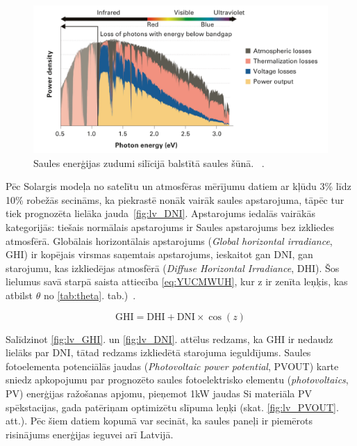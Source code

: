 \begin{figure}[h]
    \centering
    \includegraphics[width=\linewidth]{figures/misc/energyLosses.png}
    \caption{Saules enerģijas zudumi silīcijā balstītā saules šūnā.  ~\cite{Sivaram}.}
    \label{fig:zudumi}
\end{figure}


Pēc Solargis modeļa no satelītu un atmosfēras mērījumu datiem ar kļūdu 3\% līdz 10\% robežās secināms, ka piekrastē nonāk vairāk saules apstarojuma, tāpēc tur tiek prognozēta lielāka jauda~\ref{fig:lv_DNI}. Apstarojums iedalās vairākās kategorijās:
tiešais normālais apstarojums ir Saules apstarojums bez izkliedes atmosfērā.
Globālais horizontālais apstarojums (\textit{Global horizontal irradiance}, GHI) ir kopējais virsmas saņemtais apstarojums, ieskaitot gan DNI, gan starojumu, kas izkliedējas atmosfērā (\textit{Diffuse Horizontal Irradiance}, DHI). Šos lielumus savā starpā saista attiecība \ref{eq:YUCMWUH}, kur z ir zenīta leņķis, kas atbilst $\theta$ no \ref{tab:theta}. tab.)~\cite{Sivaram}.

\begin{equation}
\label{eq:YUCMWUH}
\text{GHI}=\text{DHI} + \text{DNI}\times \cos(z)
\end{equation}

Salīdzinot \ref{fig:lv_GHI}. un  \ref{fig:lv_DNI}. attēlus redzams, ka GHI ir nedaudz lielāks par DNI, tātad redzams izkliedētā starojuma ieguldījums. Saules fotoelementa potenciālās jaudas (\textit{Photovoltaic power potential}, PVOUT) karte sniedz apkopojumu par prognozēto saules fotoelektrisko elementu (\textit{photovoltaics}, PV) enerģijas ražošanas apjomu, pieņemot 1kW jaudas Si materiāla PV spēkstacijas, gada patēriņam optimizētu slīpuma leņķi (skat. \ref{fig:lv_PVOUT}. att.). Pēc šiem datiem kopumā var secināt, ka saules paneļi ir piemērots risinājums enerģijas ieguvei arī Latvijā.

